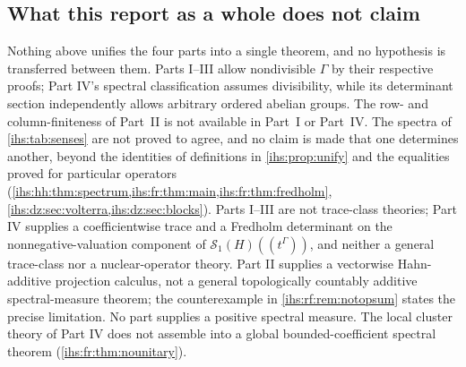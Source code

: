 \documentclass[11pt,a4paper]{article}
\numberwithin{equation}{section}
\theoremstyle{definition}
\theoremstyle{remark}
\newcommand{\SH}{\mathcal S_1(H)}
\begin{document}
\subsection{What this report as a whole does not claim}\label{ihs:app:jointnonclaims}
Nothing above unifies the four parts into a single theorem, and no hypothesis
is transferred between them. Parts I--III allow nondivisible $\Gamma$ by
their respective proofs; Part IV's spectral classification assumes
divisibility, while its determinant section independently allows arbitrary
ordered abelian groups. The row- and
column-finiteness of Part~II is not available in Part~I or Part~IV. The
spectra of \cref{ihs:tab:senses} are not proved to agree, and no claim is
made that one determines another, beyond the identities of definitions in
\cref{ihs:prop:unify} and the equalities proved for particular operators
(\cref{ihs:hh:thm:spectrum,ihs:fr:thm:main,ihs:fr:thm:fredholm},
\cref{ihs:dz:sec:volterra,ihs:dz:sec:blocks}).
Parts I--III are not trace-class theories; Part IV supplies a coefficientwise
trace and a Fredholm determinant on the nonnegative-valuation component of
$\SH((t^\Gamma))$, and neither a general trace-class nor a nuclear-operator
theory. Part II supplies a vectorwise Hahn-additive projection calculus, not
a general topologically countably additive spectral-measure theorem; the
counterexample in \cref{ihs:rf:rem:notopsum} states the precise limitation.
No part supplies a positive spectral measure. The local cluster theory of
Part IV does not assemble into a global bounded-coefficient spectral
theorem (\cref{ihs:fr:thm:nounitary}).
\end{document}
